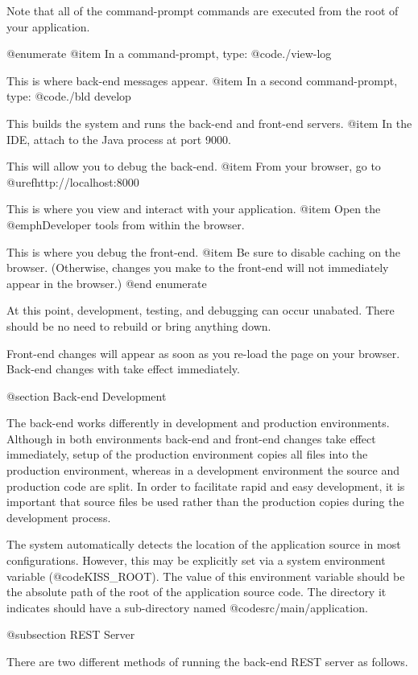 Note that all of the command-prompt commands are executed from the
root of your application.

@enumerate
@item
In a command-prompt, type:  @code{./view-log}

This is where back-end messages appear.
@item
In a second command-prompt, type:  @code{./bld develop}

This builds the system and runs the back-end and front-end servers.
@item
In the IDE, attach to the Java process at port 9000.

This will allow you to debug the back-end.
@item
From your browser, go to @uref{http://localhost:8000}

This is where you view and interact with your application.
@item
Open the @emph{Developer tools} from within the browser.

This is where you debug the front-end.
@item
Be sure to disable caching on the browser. (Otherwise, changes you make to 
the front-end will not immediately appear in the browser.)
@end enumerate

At this point, development, testing, and debugging can occur unabated.
There should be no need to rebuild or bring anything down.

Front-end changes will appear as soon as you re-load the page on your browser.
Back-end changes with take effect immediately.

@section Back-end Development

The back-end works differently in development and production
environments.  Although in both environments back-end and front-end
changes take effect immediately, setup of the production environment
copies all files into the production environment, whereas in a
development environment the source and production code are split.  In
order to facilitate rapid and easy development, it is important that
source files be used rather than the production copies during the
development process.  

The system automatically detects the location of the application
source in most configurations.  However, this may be explicitly
set via a system environment variable (@code{KISS_ROOT}).  The
value of this environment variable should be the absolute path of the
root of the application source code.  The directory it indicates
should have a sub-directory named @code{src/main/application}.



@subsection REST Server

There are two different methods of running the back-end REST server as
follows.

